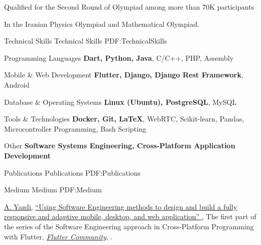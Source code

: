 \documentclass[letterpaper,MMMyyyy,nonstopmode]{resume}
\begin{document}
\begin{Body}
\Gap
\BulletItem
Qualified for the Second Round of Olympiad
among more than 70K participants
\hfill
\textsl{\small{}}
\begin{Detail}
\SubBulletItem
In the Iranian Physics Olympiad and Mathematical Olympiad.
\end{Detail}


\Section
{Technical Skills}
{Technical Skills}
{PDF:TechnicalSkills}

\BulletItem
Programming Languages
\SubBulletItem
\textbf{Dart, Python, Java}, C/C++, PHP, Assembly

\Gap
\BulletItem
Mobile \& Web Development
\SubBulletItem
\textbf{Flutter, Django, Django Rest Framework}, Android


\Gap
\BulletItem
Database \& Operating Systems
\SubBulletItem
\textbf{Linux (Ubuntu), PostgreSQL}, MySQL

\Gap
\BulletItem
Tools \& Technologies
\SubBulletItem
\textbf{Docker, Git, \LaTeX}, WebRTC, Scikit-­learn, Pandas, Microcontroller Programming, Bash Scripting

\Gap
\BulletItem
Other
\SubBulletItem
\textbf{Software Systems Engineering, Cross-Platform Application Development}



\newpage


\Section
{Publications}
{Publications}
{PDF:Publications}

\SubSection
{Medium}
{Medium}
{PDF:Medium}

\begingroup
\renewcommand{\MaxNumberedItem}{[88]}

\NumberedItem{[1]}
\href{https://medium.com/@aliyazdi75}
{\underline{A. Yazdi}},
\href{https://medium.com/flutter-community/the-software-engineering-approach-in-cross-platform-programming-with-flutter-part-1-efcdc8a8fc26}
{
``Using Software Engineering methods to design and build a fully responsive and adaptive mobile, desktop, and web application''
},
\newline The first part of the series of the Software Engineering approach in Cross-Platform Programming with Flutter,
\href{https://medium.com/flutter-community}
{\textit{Flutter Community}},
.


\end{Body}
\end{document}
